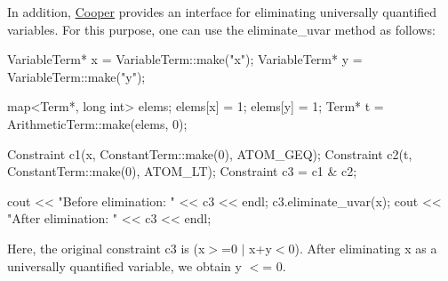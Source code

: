 \-In addition, \hyperlink{classCooper}{\-Cooper} provides an interface for eliminating universally quantified variables. \-For this purpose, one can use the eliminate\-\_\-uvar method as follows\-: \begin{DoxyVerb}
VariableTerm* x = VariableTerm::make("x");
VariableTerm* y = VariableTerm::make("y");

map<Term*, long int> elems;
elems[x] = 1;
elems[y] = 1;
Term* t = ArithmeticTerm::make(elems, 0);

Constraint c1(x, ConstantTerm::make(0), ATOM_GEQ);
Constraint c2(t, ConstantTerm::make(0), ATOM_LT);
Constraint c3 = c1 & c2;

cout << "Before elimination: " << c3 << endl;
c3.eliminate_uvar(x);
cout << "After elimination: " << c3 << endl;
\end{DoxyVerb}


\-Here, the original constraint c3 is (x$>$=0 $|$ x+y$<$0). \-After eliminating x as a universally quantified variable, we obtain y $<$= 0. 